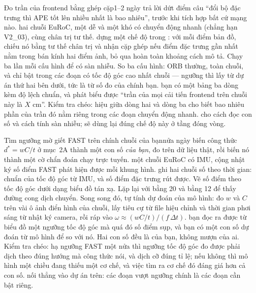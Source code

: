 \documentclass[../../deep_learning.tex]{subfiles}
\begin{document}
\begin{duan}{Đo trần của frontend bằng  ghép cặp}{1--2 ngày}
\dmt trả lời dứt điểm câu ``đổi bộ đặc trưng thì APE tốt lên nhiều nhất là bao nhiêu'', trước khi tích hợp bất cứ mạng nào.
\ddl hai chuỗi EuRoC, một dễ và một khó có chuyển động nhanh (chẳng hạn V2\_03), cùng chân trị tư thế.
\dbc dựng một chế độ  trong : với mỗi điểm bản đồ, chiếu nó bằng tư thế chân trị và nhận cặp ghép nếu điểm đặc trưng gần nhất nằm trong bán kính hai điểm ảnh, bỏ qua hoàn toàn khoảng cách mô tả. Chạy ba lần mỗi cấu hình để có sàn nhiễu. So ba cấu hình: ORB thường,  toàn chuỗi, và  chỉ bật trong các đoạn có tốc độ góc cao nhất chuỗi --- ngưỡng thì lấy từ dự án thứ hai bên dưới, tức là từ số đo của chính bạn.
\dxk bạn có một bảng ba dòng kèm độ lệch chuẩn, và phát biểu được ``trần của mọi cải tiến frontend trên chuỗi này là \(X\) cm''. Kiểm tra chéo: hiệu giữa dòng hai và dòng ba cho biết bao nhiêu phần của trần đó nằm riêng trong các đoạn chuyển động nhanh.
\dnv {} cho cách đọc con số và cách tính sàn nhiễu;  sẽ dùng lại đúng chế độ  này ở tầng đóng vòng.
\end{duan}

\begin{duan}{Tìm ngưỡng mờ giết FAST trên chính chuỗi của bạn}{nửa ngày}
\dmt biến công thức \(d^{*}=wC/t\) ở mục~2A thành một con số \emph{của bạn}, đo trên dữ liệu thật, rồi biến nó thành một cờ chẩn đoán chạy trực tuyến.
\ddl một chuỗi EuRoC có IMU, cộng nhật ký số điểm FAST phát hiện được mỗi khung hình.
\dbc ghi hai chuỗi số theo thời gian: chuẩn của tốc độ góc từ IMU, và số điểm đặc trưng rút được. Vẽ số điểm theo tốc độ góc dưới dạng biểu đồ tán xạ. Lặp lại với  bằng 20 và bằng 12 để thấy đường cong dịch chuyển. Song song đó, tự tính dự đoán của mô hình: đo \(w\) và \(C\) trên vài ô ảnh điển hình của chuỗi, lấy tiêu cự từ file hiệu chỉnh và thời gian phơi sáng từ nhật ký camera, rồi ráp vào \(\omega \approx (wC/t)/(f\,\Delta t)\).
\dxk bạn đọc ra được từ biểu đồ một ngưỡng tốc độ góc mà quá đó số điểm sụp, và bạn có một con số dự đoán từ mô hình để so với nó. Hai con số đều là của bạn, không mượn của ai. Kiểm tra chéo: hạ ngưỡng FAST một nửa thì ngưỡng tốc độ góc đo được phải dịch theo đúng hướng mà công thức nói, và dịch cỡ đúng tỉ lệ; nếu không thì mô hình một chiều đang thiếu một cơ chế, và việc tìm ra cơ chế đó đáng giá hơn cả con số.
\dnv nối thẳng vào dự án trên: các đoạn vượt ngưỡng chính là các đoạn cần bật  riêng.
\end{duan}
\end{document}
